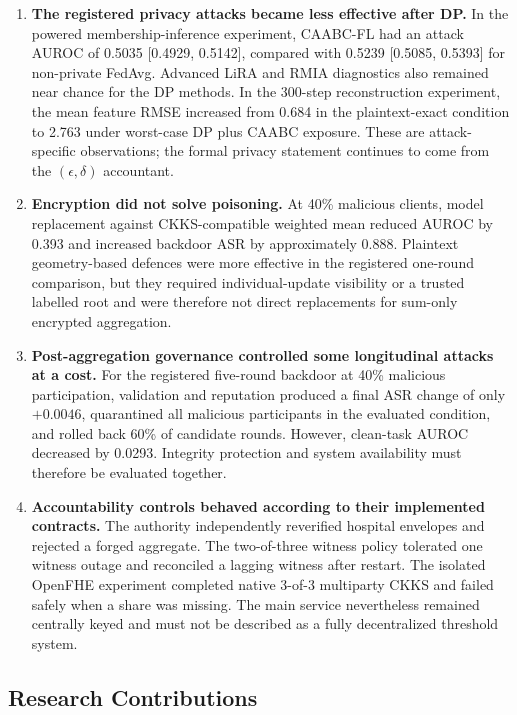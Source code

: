 \begin{enumerate}
    \item \textbf{The registered privacy attacks became less effective after DP.} In the powered membership-inference experiment, CAABC-FL had an attack AUROC of 0.5035 [0.4929, 0.5142], compared with 0.5239 [0.5085, 0.5393] for non-private FedAvg. Advanced LiRA and RMIA diagnostics also remained near chance for the DP methods. In the 300-step reconstruction experiment, the mean feature RMSE increased from 0.684 in the plaintext-exact condition to 2.763 under worst-case DP plus CAABC exposure. These are attack-specific observations; the formal privacy statement continues to come from the $(\epsilon,\delta)$ accountant.

    \item \textbf{Encryption did not solve poisoning.} At 40\% malicious clients, model replacement against CKKS-compatible weighted mean reduced AUROC by 0.393 and increased backdoor ASR by approximately 0.888. Plaintext geometry-based defences were more effective in the registered one-round comparison, but they required individual-update visibility or a trusted labelled root and were therefore not direct replacements for sum-only encrypted aggregation.

    \item \textbf{Post-aggregation governance controlled some longitudinal attacks at a cost.} For the registered five-round backdoor at 40\% malicious participation, validation and reputation produced a final ASR change of only $+0.0046$, quarantined all malicious participants in the evaluated condition, and rolled back 60\% of candidate rounds. However, clean-task AUROC decreased by 0.0293. Integrity protection and system availability must therefore be evaluated together.

    \item \textbf{Accountability controls behaved according to their implemented contracts.} The authority independently reverified hospital envelopes and rejected a forged aggregate. The two-of-three witness policy tolerated one witness outage and reconciled a lagging witness after restart. The isolated OpenFHE experiment completed native 3-of-3 multiparty CKKS and failed safely when a share was missing. The main service nevertheless remained centrally keyed and must not be described as a fully decentralized threshold system.
\end{enumerate}

\subsection{Research Contributions}


